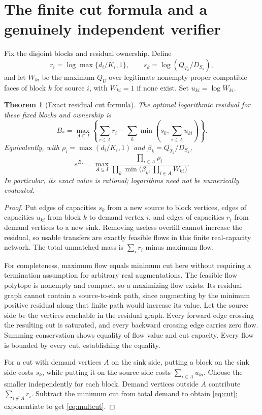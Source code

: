 \documentclass[11pt]{article}
\newtheorem{theorem}{Theorem}[section]
\theoremstyle{definition}\newtheorem{definition}[theorem]{Definition}
\theoremstyle{remark}\newtheorem{remark}[theorem]{Remark}
\begin{document}
\section{The finite cut formula and a genuinely independent verifier}\label{sec:cut}
Fix the disjoint blocks and residual ownership. Define
\[
 r_i=\log\max\{d_i/K_i,1\},\qquad s_k=\log(Q_{T_k}/D_{S_k}),
\]
and let \(W_{ki}\) be the maximum \(Q_U\) over legitimate nonempty proper compatible faces of block \(k\) for source \(i\), with \(W_{ki}=1\) if none exist. Set \(u_{ki}=\log W_{ki}\).

\begin{theorem}[Exact residual cut formula]\label{thm:cut}
The optimal logarithmic residual for these fixed blocks and ownership is
\begin{equation}\label{eq:cut}
 B_* =\max_{A\subseteq I}\left\{\sum_{i\in A}r_i-
             \sum_k\min\left(s_k,\sum_{i\in A}u_{ki}\right)\right\}.
\end{equation}
Equivalently, with \(\rho_i=\max(d_i/K_i,1)\) and \(\beta_k=Q_{T_k}/D_{S_k}\),
\begin{equation}\label{eq:multcut}
 e^{B_*}=\max_{A\subseteq I}
 \frac{\prod_{i\in A}\rho_i}
 {\prod_k\min\bigl(\beta_k,\prod_{i\in A}W_{ki}\bigr)}.
\end{equation}
In particular, its exact value is rational; logarithms need not be numerically evaluated.
\end{theorem}
\begin{proof}
Put edges of capacities \(s_k\) from a new source to block vertices, edges of capacities \(u_{ki}\) from block \(k\) to demand vertex \(i\), and edges of capacities \(r_i\) from demand vertices to a new sink. Removing useless overfill cannot increase the residual, so usable transfers are exactly feasible flows in this finite real-capacity network. The total unmatched mass is \(\sum_i r_i\) minus maximum flow.

For completeness, maximum flow equals minimum cut here without requiring a termination assumption for arbitrary real augmentations. The feasible flow polytope is nonempty and compact, so a maximizing flow exists. Its residual graph cannot contain a source-to-sink path, since augmenting by the minimum positive residual along that finite path would increase its value. Let the source side be the vertices reachable in the residual graph. Every forward edge crossing the resulting cut is saturated, and every backward crossing edge carries zero flow. Summing conservation shows equality of flow value and cut capacity. Every flow is bounded by every cut, establishing the equality.

For a cut with demand vertices \(A\) on the sink side, putting a block on the sink side costs \(s_k\), while putting it on the source side costs \(\sum_{i\in A}u_{ki}\). Choose the smaller independently for each block. Demand vertices outside \(A\) contribute \(\sum_{i\notin A}r_i\). Subtract the minimum cut from total demand to obtain \eqref{eq:cut}; exponentiate to get \eqref{eq:multcut}.
\end{proof}
\end{document}
